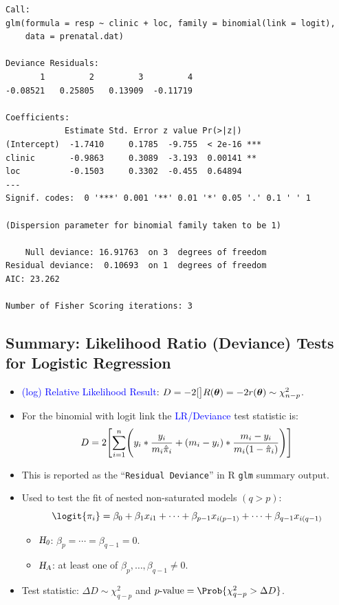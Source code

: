 \documentclass[oneside]{book}\usepackage[]{graphicx}\usepackage[svgnames]{xcolor}
\makeatletter
\newenvironment{kframe}{%
 \def\at@end@of@kframe{}%
 \ifinner\ifhmode%
  \def\at@end@of@kframe{\end{minipage}}%
  \begin{minipage}{\columnwidth}%
 \fi\fi%
 \def\FrameCommand##1{\hskip\@totalleftmargin \hskip-\fboxsep
 \colorbox{shadecolor}{##1}\hskip-\fboxsep
     \hskip-\linewidth \hskip-\@totalleftmargin \hskip\columnwidth}%
 \MakeFramed {\advance\hsize-\width
   \@totalleftmargin\z@ \linewidth\hsize
   \@setminipage}}%
 {\par\unskip\endMakeFramed%
 \at@end@of@kframe}
\newenvironment{knitrout}{}{} %
\let\log\relax%
\newcommand{\HN}{\textsl{H}_{\textsl{0}}}%
\newcommand{\HA}{\textsl{H}_{\textsl{A}}}%
\providecommand{\Vector}[1]{\bm{#1}}%
\makeatother
\begin{document}
\begin{itemize}
\begin{knitrout}
\begin{kframe}
\begin{verbatim}
Call:
glm(formula = resp ~ clinic + loc, family = binomial(link = logit), 
    data = prenatal.dat)

Deviance Residuals: 
       1         2         3         4  
-0.08521   0.25805   0.13909  -0.11719  

Coefficients:
            Estimate Std. Error z value Pr(>|z|)    
(Intercept)  -1.7410     0.1785  -9.755  < 2e-16 ***
clinic       -0.9863     0.3089  -3.193  0.00141 ** 
loc          -0.1503     0.3302  -0.455  0.64894    
---
Signif. codes:  0 '***' 0.001 '**' 0.01 '*' 0.05 '.' 0.1 ' ' 1

(Dispersion parameter for binomial family taken to be 1)

    Null deviance: 16.91763  on 3  degrees of freedom
Residual deviance:  0.10693  on 1  degrees of freedom
AIC: 23.262

Number of Fisher Scoring iterations: 3
\end{verbatim}
\end{kframe}
\end{knitrout}
\end{itemize}
\subsection*{Summary: Likelihood Ratio (Deviance) Tests for Logistic Regression}
\begin{itemize}
      \item \textcolor{Blue}{(log) Relative Likelihood Result}: $ D=-2\log[\big]{R(\Vector{\theta})}=-2r(\Vector{\theta})\sim \chi^2_{n-p} $.
      \item For the binomial with logit link the \textcolor{Blue}{LR/Deviance} test statistic is:
            \[ D=2\Biggl[\sum_{i=1}^{n} \Biggl(y_i\log*{\frac{y_i}{m_i\hat{\pi}_i}}+(m_i-y_i)\log*{\frac{m_i-y_i}{m_i(1-\hat{\pi}_i)}}\Biggr)\Biggr] \]
      \item This is reported as the ``\texttt{Residual Deviance}'' in R \texttt{glm} summary output.
      \item Used to test the fit of nested non-saturated models $ (q>p) $:
            \[ \logit{\pi_i} =\beta_0+\beta_1x_{i1}+\cdots+\beta_{p-1}x_{i(p-1)}+\cdots+\beta_{q-1}x_{i(q-1)} \]
            \begin{itemize}
                  \item $ \HN $: $ \beta_p=\cdots=\beta_{q-1}=0 $.
                  \item $ \HA $: at least one of $ \beta_p,\ldots,\beta_{q-1}\ne 0 $.
            \end{itemize}
      \item Test statistic: $ \Delta D \sim \chi^2_{q-p} $ and $ p\text{-value}=\Prob{\chi^2_{q-p}>\Delta D} $.
\end{itemize}
\end{document}
